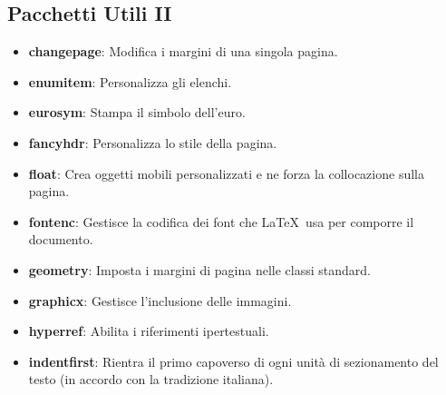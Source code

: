 \documentclass{report}
\begin{document}
            \subsection{Pacchetti Utili II}
                \begin{itemize}
                    \item \textbf{changepage}: Modifica i margini di una singola pagina.
                    \item \textbf{enumitem}: Personalizza gli elenchi.
                    \item \textbf{eurosym}: Stampa il simbolo dell'euro.
                    \item \textbf{fancyhdr}: Personalizza lo stile della pagina.
                    \item \textbf{float}: Crea oggetti mobili personalizzati e ne forza la collocazione sulla pagina.
                    \item \textbf{fontenc}: Gestisce la codifica dei font che \LaTeX\ usa per comporre il documento.
                    \item \textbf{geometry}: Imposta i margini di pagina nelle classi standard.
                    \item \textbf{graphicx}: Gestisce l'inclusione delle immagini.
                    \item \textbf{hyperref}: Abilita i riferimenti ipertestuali.
                    \item \textbf{indentfirst}: Rientra il primo capoverso di ogni unità di sezionamento del testo (in accordo con la tradizione italiana).
                \end{itemize}
\end{document}
